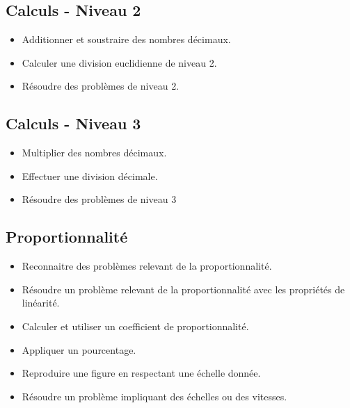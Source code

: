 \documentclass[a4paper,12pt,fleqn]{article}
\begin{document}
\subsection*{Calculs - Niveau 2}

\begin{itemize}[itemsep=1em]
	\item {}Additionner et soustraire des nombres décimaux.
	\item {}Calculer une division euclidienne de niveau 2.
	\item {}Résoudre des problèmes de niveau 2.

\end{itemize}

\subsection*{Calculs - Niveau 3}

\begin{itemize}[itemsep=1em]
	\item {}Multiplier des nombres décimaux.
	\item {}Effectuer une division décimale.
	\item {}Résoudre des problèmes de niveau 3
\end{itemize}

\newpage


\subsection*{Proportionnalité}

\begin{itemize}[itemsep=1em]
	\item {}Reconnaitre des problèmes relevant de la proportionnalité.
	\item {}Résoudre un problème relevant de la proportionnalité avec les propriétés de linéarité.	
	\item {}Calculer et utiliser un coefficient de proportionnalité.
	\item {}Appliquer un pourcentage.
	\item {}Reproduire une figure en respectant une échelle donnée.
	\item {}Résoudre un problème impliquant des échelles ou des vitesses.
\end{itemize}
\end{document}
